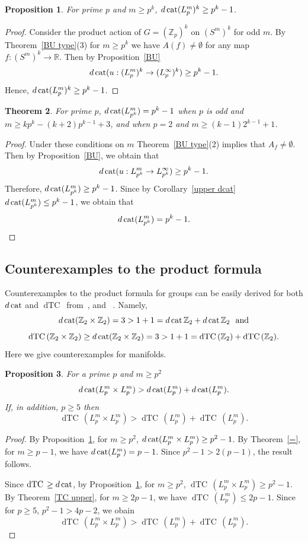 \documentclass{amsart}
\numberwithin{equation}{section}
\theoremstyle{plain}
\newtheorem{thm}{Theorem}[subsection]
\newtheorem{prop}[thm]{Proposition}
\theoremstyle{definition}
\def\dTC{{\mathop\mathrm{dTC}\,}}
\def\cat{\protect\operatorname{cat}}
\begin{document}
\begin{prop}\label{k}
For prime $p$ and $m\ge p^k$, $d\cat(L^m_p)^k\ge p^k-1$.
\end{prop}
\begin{proof}
Consider the product action of $G=(\mathbb Z_p)^k$ on $(S^m)^k$ for odd $m$.
By Theorem~\ref{BU type}(3)  for $m\ge p^k$ we have $A(f)\ne\emptyset$ for any map $f:(S^m)^k\to\mathbb R$.
Then by Proposition~\ref{BU} $$d\cat(u:(L^m_p)^k\to (L^\infty_p)^k)\ge p^k-1.$$ Hence, $d\cat(L^m_p)^k\ge p^k-1$.
\end{proof}




\begin{thm}\label{p^k}
For prime $p$,
$d\cat(L^m_{p^k})= p^k-1$ when $p$ is odd and $m\ge kp^k-(k+2)p^{k-1}+3$, and
when $p=2$ and $m\ge (k-1)2^{k-1}+1$.
\end{thm}
\begin{proof}
Under these conditions on $m$ Theorem~\ref{BU type}(2) implies that $A_f\ne\emptyset$. Then by Proposition~\ref{BU}, we obtain that
$$d\cat(u:L^m_{p^k}\to L^\infty_{p^k})\ge p^k-1.$$ Therefore, $d\cat(L^m_{p^k})\ge p^k-1$.
Since by Corollary~\ref{upper dcat} $d\cat(L^m_{p^k})\le p^k-1$, we obtain that
$$d\cat(L^m_{p^k})= p^k-1.$$
\end{proof}



\subsection{Counterexamples to the product formula}
Counterexamples to the product formula for groups can be easily derived for both $d\cat$ and $\dTC$  from~\cite{DJ},\cite{KW1} and ~\cite{KW2}.
Namely,
$$d\cat(\mathbb Z_2\times\mathbb Z_2)=3> 1+1=d\cat\mathbb Z_2+d\cat\mathbb Z_2\ \ \text{and}$$
$$\dTC(\mathbb Z_2\times\mathbb Z_2)\ge d\cat(\mathbb Z_2\times\mathbb Z_2)=3> 1+1=\dTC(\mathbb Z_2)+\dTC(\mathbb Z_2).$$
Here we give counterexamples for manifolds.
\begin{prop}
For a prime $p$ and $m\ge p^2$
$$
d\cat(L_p^m\times L^m_p)> d\cat(L_p^m)+d\cat(L_p^m).
$$
If, in addition, $p\ge 5$  then
$$
\dTC(L_p^m\times L_p^m) > \dTC(L^m_p)+\dTC(L^m_p).
$$
\end{prop}
\begin{proof}
By Proposition~\ref{k}, for $m\ge p^2$, 
$
d\cat(L_p^m\times L^m_p)\ge p^2-1$.
By Theorem~\ref{=},  for $m\ge p-1$, we have $d\cat(L^m_p)=p-1$.
Since $p^2-1>2(p-1)$, the result follows.

Since $\dTC\ge d\cat$, by Proposition~\ref{k}, for $m\ge p^2$, 
$
\dTC(L_p^m\times L_p^m)\ge p^2-1.$
By Theorem~\ref{TC upper}, for $m\ge 2p-1$, we have $\dTC(L^m_p)\le 2p-1$. Since for $p\ge 5$, $p^2-1>4p-2$, we obain 
$$\dTC(L_p^m\times L_p^m) > \dTC(L^m_p)+\dTC(L^m_p).$$
\end{proof}
\end{document}
